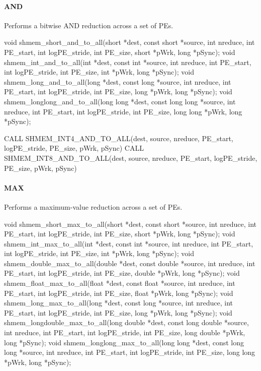 
\begin{apidefinition}

\paragraph{AND}
Performs a bitwise AND reduction across a set of \acp{PE}.\newline
\begin{Csynopsis}
void shmem_short_and_to_all(short *dest, const short *source, int nreduce, int PE_start, int logPE_stride, int PE_size, short *pWrk, long *pSync);
void shmem_int_and_to_all(int *dest, const int *source, int nreduce, int PE_start, int logPE_stride, int PE_size, int *pWrk, long *pSync);
void shmem_long_and_to_all(long *dest, const long *source, int nreduce, int PE_start, int logPE_stride, int PE_size, long *pWrk, long *pSync);
void shmem_longlong_and_to_all(long long *dest, const long long *source, int nreduce, int PE_start, int logPE_stride, int PE_size, long long *pWrk, long *pSync);
\end{Csynopsis}

\begin{Fsynopsis}
CALL SHMEM_INT4_AND_TO_ALL(dest, source, nreduce, PE_start, logPE_stride, PE_size, pWrk, pSync)
CALL SHMEM_INT8_AND_TO_ALL(dest, source, nreduce, PE_start, logPE_stride, PE_size, pWrk, pSync)
\end{Fsynopsis}

\paragraph{MAX}
Performs a maximum-value reduction across a set of \acp{PE}.\newline
\begin{Csynopsis}
void shmem_short_max_to_all(short *dest, const short *source, int nreduce, int PE_start, int logPE_stride, int PE_size, short *pWrk, long *pSync);
void shmem_int_max_to_all(int *dest, const int *source, int nreduce, int PE_start, int logPE_stride, int PE_size, int *pWrk, long *pSync);
void shmem_double_max_to_all(double *dest, const double *source, int nreduce, int PE_start, int logPE_stride, int PE_size, double *pWrk, long *pSync);
void shmem_float_max_to_all(float *dest, const float *source, int nreduce, int PE_start, int logPE_stride, int PE_size, float *pWrk, long *pSync);
void shmem_long_max_to_all(long *dest, const long *source, int nreduce, int PE_start, int logPE_stride, int PE_size, long *pWrk, long *pSync);
void shmem_longdouble_max_to_all(long double *dest, const long double *source, int nreduce, int PE_start, int logPE_stride, int PE_size, long double *pWrk, long *pSync);
void shmem_longlong_max_to_all(long long *dest, const long long *source, int nreduce, int PE_start, int logPE_stride, int PE_size, long long *pWrk, long *pSync);
\end{Csynopsis}


\end{apidefinition}
